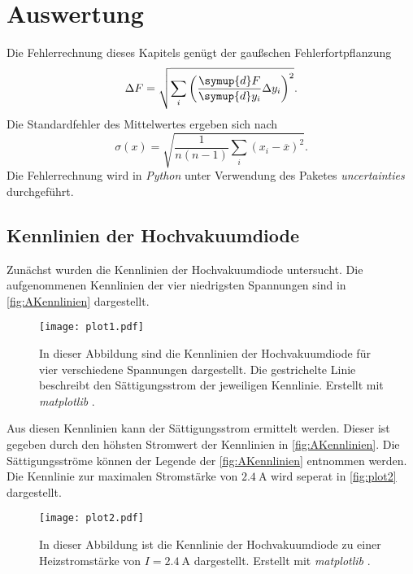 \section{Auswertung}
\label{sec:Auswertung}

Die Fehlerrechnung dieses Kapitels genügt der gaußschen Fehlerfortpflanzung
\begin{equation*}
  \label{eqn:Gauss}
  \Delta F = \sqrt{\sum_i\left(\frac{\symup{d}F}{\symup{d}y_i}\Delta y_i \right)^2}.
\end{equation*}
Die Standardfehler des Mittelwertes ergeben sich nach
\begin{equation*}
  \label{eqn:MW-Fehler}
  \sigma(x) = \sqrt{\frac{1}{n(n-1)} \sum_i (x_i - \overline{x})^2}.
\end{equation*}
Die Fehlerrechnung wird in \textit{Python} unter Verwendung des Paketes \textit{uncertainties} \cite{uncertainties} durchgeführt.

\subsection{Kennlinien der Hochvakuumdiode}
\label{subsec:AKennlinie}
Zunächst wurden die Kennlinien der Hochvakuumdiode untersucht. Die aufgenommenen Kennlinien der vier niedrigsten Spannungen sind in \autoref{fig:AKennlinien} dargestellt.

\begin{figure}
  \centering
  \texttt{[image: plot1.pdf]}
  \caption{In dieser Abbildung sind die Kennlinien der Hochvakuumdiode für vier verschiedene Spannungen dargestellt. Die gestrichelte Linie beschreibt den Sättigungsstrom der jeweiligen Kennlinie.
           Erstellt mit \textit{matplotlib} \cite{matplotlib}.}
  \label{fig:AKennlinien}
\end{figure}

Aus diesen Kennlinien kann der Sättigungsstrom ermittelt werden. Dieser ist gegeben durch den höhsten Stromwert der Kennlinien in \autoref{fig:AKennlinien}. Die Sättigungsströme
können der Legende der \autoref{fig:AKennlinien} entnommen werden. Die Kennlinie zur maximalen Stromstärke von $\qty{2.4}{\ampere}$ wird seperat in \autoref{fig:plot2} 
dargestellt.

\begin{figure}[H]
  \centering
  \texttt{[image: plot2.pdf]}
  \caption{In dieser Abbildung ist die Kennlinie der Hochvakuumdiode zu einer Heizstromstärke von $I = \qty{2.4}{\ampere}$ dargestellt. Erstellt mit \textit{matplotlib} \cite{matplotlib}.}
  \label{fig:plot2}
\end{figure} 

